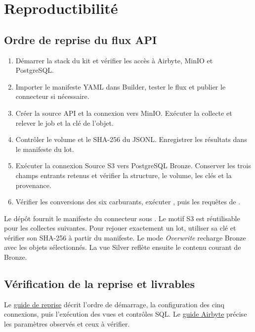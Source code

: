 \documentclass[11pt,a4paper]{article}
\begin{document}
\section{Reproductibilité}

\subsection{Ordre de reprise du flux API}

\begin{enumerate}
  \item Démarrer la stack du kit et vérifier les accès à Airbyte,
        MinIO et PostgreSQL.
  \item Importer le manifeste YAML dans Builder, tester le flux
        et publier le connecteur si nécessaire.
  \item Créer la source API et la connexion vers MinIO. Exécuter
        la collecte et relever le job et la clé de l'objet.
  \item Contrôler le volume et le SHA-256 du JSONL.
        Enregistrer les résultats dans le manifeste du lot.
  \item Exécuter la connexion Source S3 vers PostgreSQL Bronze.
        Conserver les trois champs entrants retenus et vérifier
        la structure, le volume, les clés et la provenance.
  \item Vérifier les conversions des six carburants, exécuter
        , puis les requêtes
        de .
\end{enumerate}

Le dépôt fournit le manifeste du connecteur sous
.
Le motif S3 est réutilisable pour les collectes suivantes.
Pour rejouer exactement un lot, utiliser sa clé et vérifier son
SHA-256 à partir du manifeste. Le mode \emph{Overwrite} recharge
Bronze avec les objets sélectionnés. La vue Silver reflète ensuite
le contenu courant de Bronze.

\subsection{Vérification de la reprise et livrables}

Le
\href{https://github.com/MAHDIghr/projet_big_data_starter/blob/main/README.md}{guide de reprise}
décrit l'ordre de démarrage, la configuration des cinq connexions,
puis l'exécution des vues et contrôles SQL. Le
\href{https://github.com/MAHDIghr/projet_big_data_starter/blob/main/airbyte/README_AIRBYTE.md}{guide Airbyte}
précise les paramètres observés et ceux à vérifier.
\end{document}
